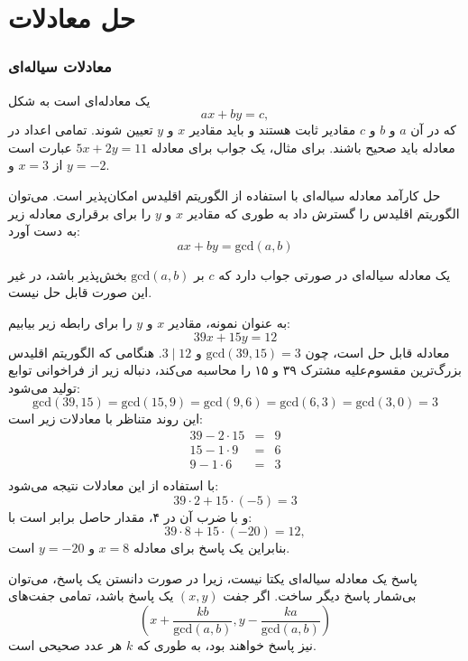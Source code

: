 \section{حل معادلات}

\subsubsection*{معادلات سیاله‌ای}


یک 
معادله‌ای است به شکل
\[ ax + by = c, \]
که در آن $a$ و $b$ و $c$ مقادیر ثابت هستند
و باید مقادیر $x$ و $y$ تعیین شوند.
تمامی اعداد در معادله باید صحیح باشند.
برای مثال، یک جواب برای معادله
$5x+2y=11$ عبارت است از $x=3$ و $y=-2$.


حل کارآمد معادله سیاله‌ای با استفاده از الگوریتم اقلیدس امکان‌پذیر است.
می‌توان الگوریتم اقلیدس را گسترش داد
به طوری که مقادیر $x$ و $y$ را برای برقراری معادله زیر به دست آورد:
\[
ax + by = \textrm{gcd}(a,b)
\]

یک معادله سیاله‌ای در صورتی جواب دارد که
$c$ بر
$\textrm{gcd}(a,b)$
بخش‌پذیر باشد،
در غیر این صورت قابل حل نیست.

به عنوان نمونه، مقادیر $x$ و $y$ را برای رابطه زیر بیابیم:
\[
39x + 15y = 12
\]
معادله قابل حل است، چون
$\textrm{gcd}(39,15)=3$ و $3 \mid 12$.
هنگامی که الگوریتم اقلیدس بزرگ‌ترین مقسوم‌علیه مشترک ۳۹ و ۱۵ را محاسبه می‌کند،
دنباله زیر از فراخوانی توابع تولید می‌شود:
\[
\textrm{gcd}(39,15) = \textrm{gcd}(15,9)
= \textrm{gcd}(9,6) = \textrm{gcd}(6,3)
= \textrm{gcd}(3,0) = 3 \]
این روند متناظر با معادلات زیر است:
\[
\begin{array}{lcl}
39 - 2 \cdot 15 & = & 9 \\
15 - 1 \cdot 9 & = & 6 \\
9 - 1 \cdot 6 & = & 3 \\
\end{array}
\]
با استفاده از این معادلات نتیجه می‌شود:
\[
39 \cdot 2 + 15 \cdot (-5) = 3
\]
و با ضرب آن در ۴، مقدار حاصل برابر است با:
\[
39 \cdot 8 + 15 \cdot (-20) = 12,
\]
بنابراین یک پاسخ برای معادله
$x=8$ و $y=-20$ است.

پاسخ یک معادله سیاله‌ای یکتا نیست،
زیرا در صورت دانستن یک پاسخ، می‌توان بی‌شمار پاسخ دیگر ساخت.
اگر جفت $(x,y)$ یک پاسخ باشد، تمامی جفت‌های
\[(x+\frac{kb}{\textrm{gcd}(a,b)},y-\frac{ka}{\textrm{gcd}(a,b)})\]
نیز پاسخ خواهند بود، به طوری که $k$ هر عدد صحیحی است.

